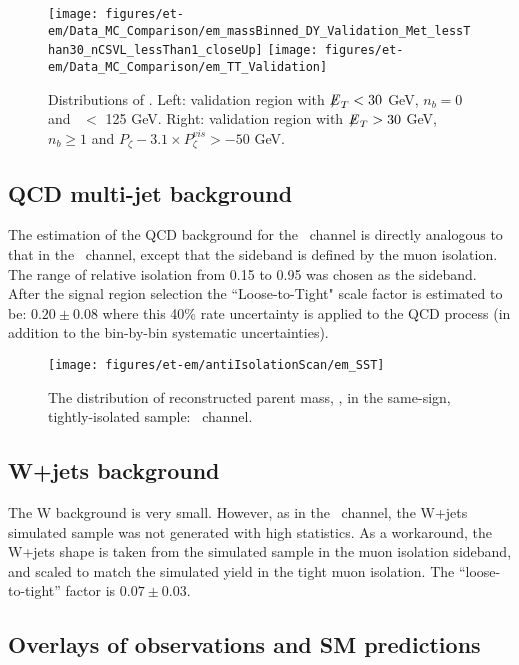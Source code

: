 \begin{figure}\centering
  \texttt{[image: figures/et-em/Data\_MC\_Comparison/em\_massBinned\_DY\_Validation\_Met\_lessThan30\_nCSVL\_lessThan1\_closeUp]}
  \texttt{[image: figures/et-em/Data\_MC\_Comparison/em\_TT\_Validation]}
  \caption{\label{fig:em_dy_tt} Distributions of \meffemu. Left:
    validation region with ${\not\mathrel{E}}_T<30$ GeV, $n_b = 0$ and \meffemu ~$<$ 125 GeV.  Right:
    validation region with ${\not\mathrel{E}}_T>30$ GeV, $n_b\geq1$ and $P_{\zeta}- 3.1 \times P_{\zeta}^{vis} > -50$ GeV.}
\end{figure}




\subsection{QCD multi-jet background}\label{sec:em_qcd}
The estimation of the QCD background for the \tetm ~channel is directly
analogous to that in the \teth ~channel, except that the sideband is
defined by the muon isolation. The range of relative
isolation from 0.15 to 0.95 was chosen as the sideband. After the
signal region selection the ``Loose-to-Tight" scale factor is estimated
to be: $0.20 \pm 0.08$ where this 40\% rate uncertainty is applied to
the QCD process (in addition to the bin-by-bin systematic
uncertainties). 

\begin{figure}[thbp!]\centering
  \texttt{[image: figures/et-em/antiIsolationScan/em\_SST]}
  \caption{\label{fig:em_sst} The distribution of reconstructed parent
    mass, \meffemu , in the same-sign, tightly-isolated sample: \tetm
    ~channel.}
\end{figure}

\subsection{W+jets background}
\label{sec:em_w_bkg_validation}
The W background is very small.  However, as in the \teth ~channel, the
W+jets simulated sample was not generated with high statistics.  As a
workaround, the W+jets shape is taken from the simulated sample in the
muon isolation sideband, and scaled to match the simulated yield in
the tight muon isolation.  The ``loose-to-tight'' factor is
$0.07\pm0.03$.

\subsection{Overlays of observations and SM predictions}
\label{sec:em_overlays}

